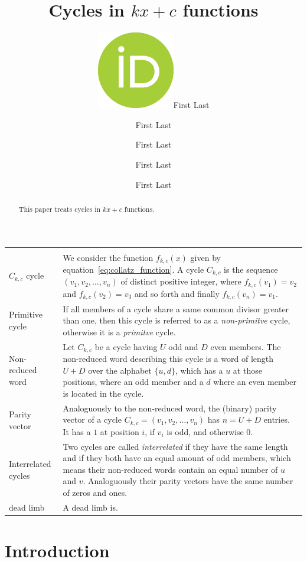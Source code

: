 \documentclass[12pt]{amsart}
\title[Cycles in kx+c functions]{Cycles in $kx+c$ functions}
\author[F.\ Last1]{\href{https://orcid.org/0000-0000-0000-0000}{\includegraphics[scale=0.06]{orcid.png}}\hspace{1mm}First Last}
\author[F.\ Last2]{First Last}
\author[F.\ Last3]{First Last}
\author[F.\ Last4]{First Last}
\author[F.\ Last5]{First Last}
\theoremstyle{definition}
\begin{document}
	
\begingroup
\let\MakeUppercase\relax
\maketitle
\endgroup

\begin{abstract}
This paper treats cycles in $kx+c$ functions. 
\end{abstract}

\newpage
{\renewcommand{\arraystretch}{1.8}
\begin{table}[H]
	\centering
	\begin{tabular}{|P{1.4cm} p{13.4cm}|}
		\hline
		\\
		$C_{k,c}$ cycle & We consider the function $f_{k,c}(x)$ given by equation~\ref{eq:collatz_function}. A cycle $C_{k,c}$ is the sequence $(v_1, v_2,\ldots, v_n)$ of distinct positive integer, where $f_{k,c}(v_1)=v_2$ and $f_{k,c}(v_2)=v_3$ and so forth and finally $f_{k,c}(v_n)=v_1$.
		\\
		Primitive cycle & If all members of a cycle share a same common divisor greater than one, then this cycle is referred to as a \textit{non-primitve} cycle, otherwise it is a \textit{primitve} cycle.
		\\
		Non-reduced word & Let $C_{k,c}$ be a cycle having $U$ odd and $D$ even members. The non-reduced word describing this cycle is a word of length $U+D$ over the alphabet $\{u,d\}$, which has a $u$ at those positions, where an odd member and a $d$ where an even member is located in the cycle.
		\\
		Parity vector & Analoguously to the non-reduced word, the (binary) parity vector of a cycle $C_{k,c}=(v_1,v_2,\ldots,v_n)$ has $n=U+D$ entries. It has a $1$ at position $i$, if $v_i$ is odd, and otherwise $0$.
		\\
		Interrelated cycles & Two cycles are called \textit{interrelated} if they have the same length and if they both have an equal amount of odd members, which means their non-reduced words contain an equal number of $u$ and $v$. Analoguously their parity vectors have the same number of zeros and ones.
		\\
		dead limb & A dead limb is. 
		\\ \hline
	\end{tabular}
\end{table}}

\section{Introduction}
\label{sec:introduction}
\end{document}
